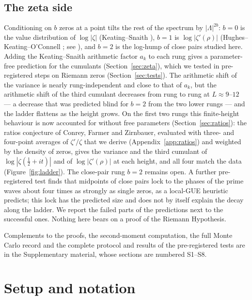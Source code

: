 \documentclass[12pt]{amsart}
\theoremstyle{remark}
\newcommand{\1}{\mathbf{1}}
\begin{document}
\subsection*{The zeta side}
Conditioning on $b$ zeros at a point tilts the rest of the spectrum by
$|\Lambda|^{2b}$: $b=0$ is the value distribution of $\log|\zeta|$
(Keating--Snaith \cite{KS00}), $b=1$ is $\log|\zeta'(\rho)|$
(Hughes--Keating--O'Connell \cite{HKO00}; see \cite{BGM15}), and $b=2$ is
the log-hump of close pairs studied here. Adding the Keating--Snaith
arithmetic factor $a_k$ to each rung gives a parameter-free prediction for
the cumulants (Section~\ref{sec:zeta}), which we tested in pre-registered
steps on Riemann zeros (Section~\ref{sec:tests}). The arithmetic shift of
the variance is nearly rung-independent and close to that of $a_k$, but the
arithmetic shift of the third cumulant decreases from
rung to rung at $L\approx9$--$12$ --- a decrease that was predicted blind
for $b=2$ from the two lower rungs --- and the ladder flattens as the height
grows. On the first two rungs this finite-height behaviour is now
accounted for without free parameters (Section~\ref{sec:ratios}): the
ratios conjecture of Conrey, Farmer and Zirnbauer, evaluated with three-
and four-point averages of $\zeta'/\zeta$ that we derive
(Appendix~\ref{app:ratios}) and weighted by the density of zeros, gives
the variance and the third cumulant of $\log|\zeta(\frac12+it)|$ and of
$\log|\zeta'(\rho)|$ at each height, and all four match the data
(Figure~\ref{fig:ladder}). The close-pair rung $b=2$ remains open. A
further pre-registered test finds that midpoints of close pairs lock to the
phases of the prime waves about four times as strongly as single zeros, as
a local-GUE heuristic predicts; this lock has the predicted size and does
not by itself explain the decay along the ladder. We report the failed parts of the predictions next to the
successful ones. Nothing here bears on a proof of the Riemann Hypothesis.

Complements to the proofs, the second-moment computation, the full Monte
Carlo record and the complete protocol and results of the pre-registered
tests are in the Supplementary material, whose sections are numbered
S1--S8.

\section{Setup and notation}\label{sec:setup}
\end{document}
